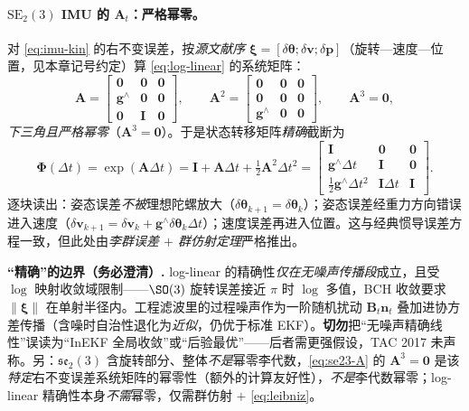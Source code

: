 \paragraph{$\mathrm{SE}_2(3)$ IMU 的 $\mathbf{A}_t$：严格幂零。}
对 \cref{eq:imu-kin} 的右不变误差，按\emph{源文献序} $\boldsymbol{\xi}=[\delta\boldsymbol{\theta};\delta\mathbf{v};\delta\mathbf{p}]$（旋转—速度—位置，见本章记号约定）算 \cref{eq:log-linear} 的系统矩阵\cite{barrau2017invariant}：
\begin{equation}
  \mathbf{A}=\begin{bmatrix}\mathbf{0}&\mathbf{0}&\mathbf{0}\\\mathbf{g}^\wedge&\mathbf{0}&\mathbf{0}\\\mathbf{0}&\mathbf{I}&\mathbf{0}\end{bmatrix},\qquad
  \mathbf{A}^2=\begin{bmatrix}\mathbf{0}&\mathbf{0}&\mathbf{0}\\\mathbf{0}&\mathbf{0}&\mathbf{0}\\\mathbf{g}^\wedge&\mathbf{0}&\mathbf{0}\end{bmatrix},\qquad \mathbf{A}^3=\mathbf{0},
  \label{eq:se23-A}
\end{equation}
\emph{下三角且严格幂零}（$\mathbf{A}^3=\mathbf{0}$）。于是状态转移矩阵\emph{精确}截断为\cite{barrau2017invariant}
\begin{equation}
  \boldsymbol{\Phi}(\Delta t)=\exp(\mathbf{A}\Delta t)=\mathbf{I}+\mathbf{A}\Delta t+\tfrac12\mathbf{A}^2\Delta t^2
  =\begin{bmatrix}\mathbf{I}&\mathbf{0}&\mathbf{0}\\\mathbf{g}^\wedge\Delta t&\mathbf{I}&\mathbf{0}\\\tfrac12\mathbf{g}^\wedge\Delta t^2&\mathbf{I}\Delta t&\mathbf{I}\end{bmatrix}.
  \label{eq:se23-Phi}
\end{equation}
逐块读出：姿态误差\emph{不被}理想陀螺放大（$\delta\boldsymbol{\theta}_{k+1}=\delta\boldsymbol{\theta}_k$）；姿态误差经重力方向错误进入速度（$\delta\mathbf{v}_{k+1}=\delta\mathbf{v}_k+\mathbf{g}^\wedge\delta\boldsymbol{\theta}_k\Delta t$）；速度误差再进入位置。这与经典惯导误差方程一致，但此处由\emph{李群误差 $+$ 群仿射定理}严格推出。

\begin{note}
\textbf{“精确”的边界（务必澄清）.}\;
log-linear 的精确性\emph{仅在无噪声传播段}成立，且受 $\log$ 映射收敛域限制——$\SO(3)$ 旋转误差接近 $\pi$ 时 $\log$ 多值，BCH 收敛要求 $\|\boldsymbol{\xi}\|$ 在单射半径内。工程滤波里的过程噪声作为一阶随机扰动 $\mathbf{B}_t\mathbf{n}_t$ 叠加进协方差传播（含噪时自治性退化为\emph{近似}，仍优于标准 EKF）。\textbf{切勿}把“无噪声精确线性”误读为“InEKF 全局收敛”或“后验最优”——后者需更强假设，TAC 2017 未声称。另：$\mathfrak{se}_2(3)$ 含旋转部分、整体\emph{不是}幂零李代数，\cref{eq:se23-A} 的 $\mathbf{A}^3=\mathbf{0}$ 是该\emph{特定}右不变误差系统矩阵的幂零性（额外的计算友好性），\emph{不是}李代数幂零；log-linear 精确性本身\emph{不需}幂零，仅需群仿射 $+$ \cref{eq:leibniz}。
\end{note}

